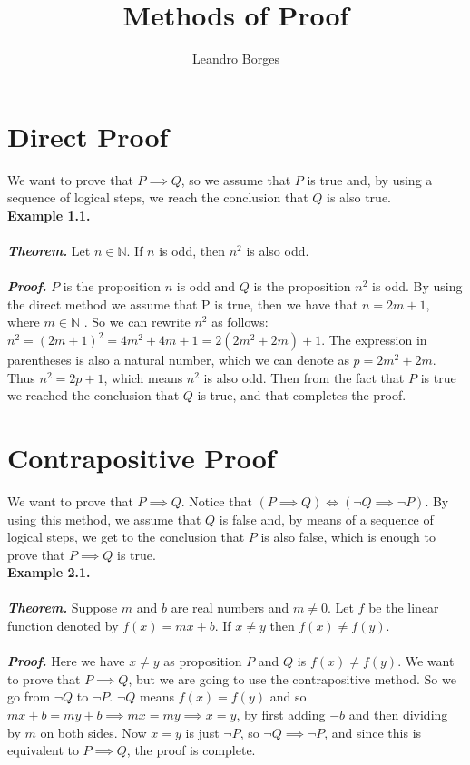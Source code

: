 \documentclass[]{article}
\title{Methods of Proof}
\author{Leandro Borges}
\begin{document}
\maketitle



\section{Direct Proof}
We want to prove that $P \implies Q$, so we assume that $P$ is true and, by using a sequence of logical steps, we reach the conclusion that $Q$ is also true.\\

\textbf{Example 1.1.}\\\\
\textit{\textbf{Theorem.}} Let $n \in \mathbb{N}$. If $n$ is odd, then $n^2$ is also odd.
\\\\\textit{\textbf{Proof.}} $P$ is the proposition $n$ is odd and $Q$ is the proposition $n^2$ is odd. By using the direct method we assume that P is true, then we have that $n = 2m + 1$, where $m \in \mathbb{N}$ . So we can rewrite $n^2$ as follows: $n^2 = (2m + 1)^2 = 4m^2 + 4m + 1 = 2(2m^2 + 2m) + 1$. The expression in parentheses is also a natural number, which we can denote as $p = 2m^2 + 2m$. Thus $n^2 = 2p + 1$, which means $n^2$ is also odd. Then from the fact that $P$ is true we reached the conclusion that $Q$ is true, and that completes the proof.


\section{Contrapositive Proof}
We want to prove that $P \implies Q$. Notice that $(P \implies Q) \iff  (\neg Q \implies \neg P)$. By using this method, we assume that $Q$ is false and, by means of a sequence of logical steps, we get to the conclusion that $P$ is also false, which is enough to prove that $P \implies Q$ is true.\\

\textbf{Example 2.1.}\\\\
\textit{\textbf{Theorem.}} Suppose $m$ and $b$ are real numbers and $m \neq 0$. Let $f$ be the linear function denoted by $f(x) = mx + b$. If $x \neq y$ then $f(x) \neq f(y)$.
\\\\\textit{\textbf{Proof.}} Here we have $x \neq y$ as proposition $P$ and $Q$ is $f(x) \neq f(y)$. We want to prove that $P \implies Q$, but we are going to use the contrapositive method. So we go from $\neg Q$ to $\neg P$. $\neg Q$ means $f(x) = f(y)$ and so $mx + b = my + b \implies mx = my \implies x = y$, by first adding $-b$ and then dividing by $m$ on both sides. Now $x = y$ is just $\neg P$, so $\neg Q \implies \neg P$, and since this is equivalent to $P \implies Q$, the proof is complete.
 
\end{document}
